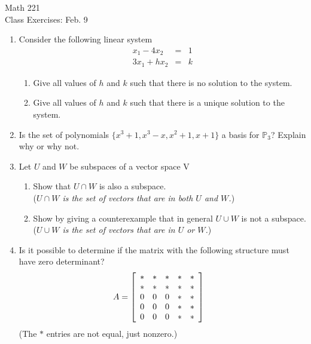\documentclass[11pt]{article}
\begin{document}
\begin{center}
	\Large
	\rm{Math 221}
	\\
	\rm{Class Exercises:  Feb. 9}
	\\
\end{center}
\vspace{0.2in}

\begin{enumerate}


\item {Consider the following linear system
	\begin{eqnarray*}
		x_1 - 4x_2 &=& 1 \\
		3x_1 + hx_2 & = & k
	\end{eqnarray*}
	
	\begin{enumerate}
		\item{Give all values of $h$ and $k$ such that there is no solution to the system.}
		\item{Give all values of $h$ and $k$ such that there is a unique solution to the system.}
	\end{enumerate}
}

\item {Is the set of polynomials $\{x^3+1, x^3-x, x^2 + 1, x+1  \}$ a basis for $\mathbb{P}_3$? Explain why or why not.}

\item {Let $U$ and $W$ be subspaces of a vector space V 
	\begin{enumerate}
		\item{Show that $U\cap W$ is also a subspace.  
			\\(\textit{$U\cap W$ is the set of vectors that are in both $U$ and $W$.})}
		\item{Show by giving a counterexample that in general $U\cup W$ is not a subspace.  \\(\textit{$U\cup W$ is the set of vectors that are in $U$ or $W$.})  } 
	\end{enumerate}
}

\item{Is it possible to determine if the matrix with the following structure must have zero determinant?
\begin{displaymath}
A = \left[ \begin{array}{rrrrr}  
* & * & * & * & * \\  
\** & * & * & * & * \\ 
0 & 0 & 0 & * & * \\ 
0 & 0 & 0 & * & * \\ 
0 & 0 & 0 & * & * \\ 
\end{array} \right] \quad
\end{displaymath}
(The $*$ entries are not equal, just nonzero.)
}


\end{enumerate}
\end{document}
